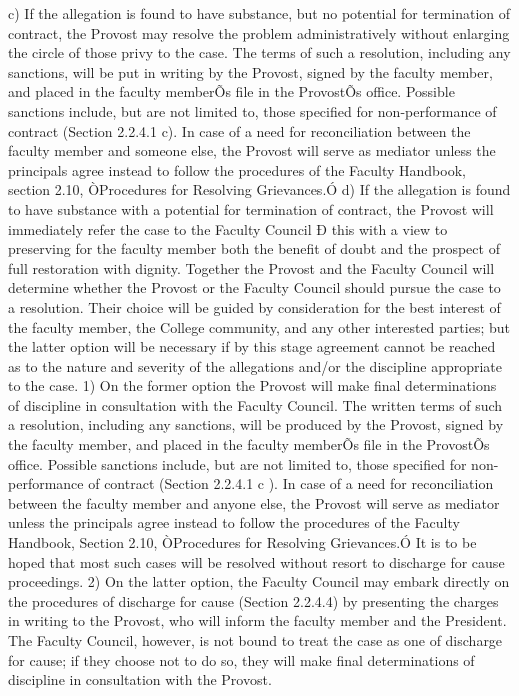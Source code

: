 \documentclass[letterpaper, 11pt]{article}
\begin{document}
c) If the allegation is found to have substance, but no potential for termination of contract, the Provost may resolve the problem administratively without enlarging the circle of those privy to the case.  The terms of such a resolution, including any sanctions, will be put in writing by the Provost, signed by the faculty member, and placed in the faculty memberÕs file in the ProvostÕs office.  Possible sanctions include, but are not limited to, those specified for non-performance of contract (Section 2.2.4.1 c).  In case of a need for reconciliation between the faculty member and someone else, the Provost will serve as mediator unless the principals agree instead to follow the procedures of the Faculty Handbook, section 2.10, ÒProcedures for Resolving Grievances.Ó
d) If the allegation is found to have substance with a potential for termination of contract, the Provost will immediately refer the case to the Faculty Council Ð this with a view to preserving for the faculty member both the benefit of doubt and the prospect of full restoration with dignity.  Together the Provost and the Faculty Council will determine whether the Provost or the Faculty Council should pursue the case to a resolution.  Their choice will be guided by consideration for the best interest of the faculty member, the College community, and any other interested parties; but the latter option will be necessary if by this stage agreement cannot be reached as to the nature and severity of the allegations and/or the discipline appropriate to the case.
1) On the former option the Provost will make final determinations of discipline in consultation with the Faculty Council.  The written terms of such a resolution, including any sanctions, will be produced by the Provost, signed by the faculty member, and placed in the faculty memberÕs file in the ProvostÕs office.  Possible sanctions include, but are not limited to, those specified for non-performance of contract (Section 2.2.4.1 c ).  In case of a need for reconciliation between the faculty member and anyone else, the Provost will serve as mediator unless the principals agree instead to follow the procedures of the Faculty Handbook, Section 2.10, ÒProcedures for Resolving Grievances.Ó  It is to be hoped that most such cases will be resolved without resort to discharge for cause proceedings.
2) On the latter option, the Faculty Council may embark directly on the procedures of discharge for cause (Section 2.2.4.4) by presenting the charges in writing to the Provost, who will inform the faculty member and the President.  The Faculty Council, however, is not bound to treat the case as one of discharge for cause; if they choose not to do so, they will make final determinations of discipline in consultation with the Provost.
\end{document}

